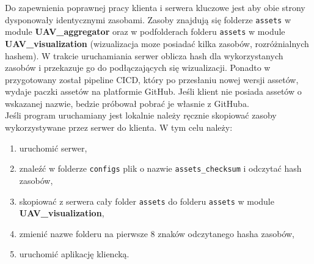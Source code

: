 \documentclass[15pt]{sprawozdanie}
\begin{document}
Do zapewnienia poprawnej pracy klienta i serwera kluczowe jest aby obie strony dysponowały identycznymi zasobami. Zasoby znajdują się folderze \texttt{assets} w module \textbf{UAV\_aggregator} oraz w podfolderach folderu \texttt{assets} w module \textbf{UAV\_visualization} (wizualizacja moze posiadać kilka zasobów, rozróżnialnych hashem). W trakcie uruchamiania serwer oblicza hash dla wykorzystanych zasobów i przekazuje go do podłączających się wizualizacji. Ponadto w przygotowany został pipeline CICD, który po przesłaniu nowej wersji assetów, wydaje paczki assetów na platformie GitHub. Jeśli klient nie posiada assetów o wskazanej nazwie, bedzie próbował pobrać je własnie z GitHuba.\\

Jeśli program uruchamiany jest lokalnie należy ręcznie skopiować zasoby wykorzystywane przez serwer do klienta. W tym celu należy:
\begin{enumerate}
\item uruchomić serwer,
\item znaleźć w folderze \texttt{configs} plik o nazwie \texttt{assets\_checksum} i odczytać hash zasobów,
\item skopiować z serwera cały folder \texttt{assets} do folderu \texttt{assets} w module\\ \textbf{UAV\_visualization},
\item zmienić nazwe folderu na pierwsze 8 znaków odczytanego hasha zasobów,
\item uruchomić aplikację kliencką.
\end{enumerate}
\end{document}
